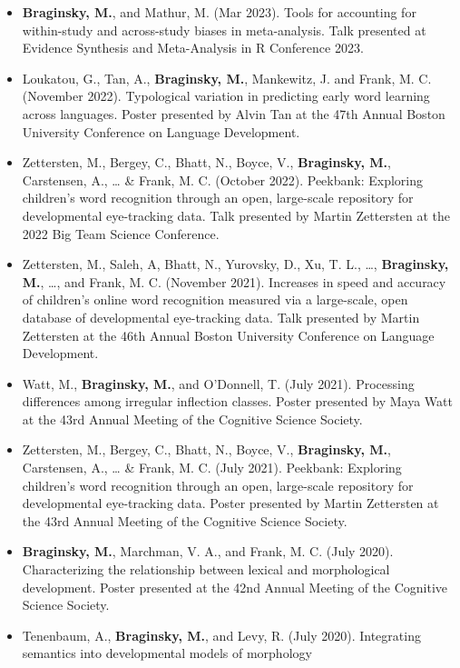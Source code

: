 \documentclass[11pt,]{article}
\begin{document}
\begin{itemize}
\item
  \textbf{Braginsky, M.}, and Mathur, M. (Mar 2023). Tools for
  accounting for within-study and across-study biases in meta-analysis.
  Talk presented at Evidence Synthesis and Meta-Analysis in R Conference
  2023.
\item
  Loukatou, G., Tan, A., \textbf{Braginsky, M.}, Mankewitz, J. and
  Frank, M. C. (November 2022). Typological variation in predicting
  early word learning across languages. Poster presented by Alvin Tan at
  the 47th Annual Boston University Conference on Language Development.
\item
  Zettersten, M., Bergey, C., Bhatt, N., Boyce, V., \textbf{Braginsky,
  M.}, Carstensen, A., \ldots{} \& Frank, M. C. (October 2022).
  Peekbank: Exploring children's word recognition through an open,
  large-scale repository for developmental eye-tracking data. Talk
  presented by Martin Zettersten at the 2022 Big Team Science
  Conference.
\item
  Zettersten, M., Saleh, A, Bhatt, N., Yurovsky, D., Xu, T. L., \ldots,
  \textbf{Braginsky, M.}, \ldots, and Frank, M. C. (November 2021).
  Increases in speed and accuracy of children's online word recognition
  measured via a large-scale, open database of developmental
  eye-tracking data. Talk presented by Martin Zettersten at the 46th
  Annual Boston University Conference on Language Development.
\item
  Watt, M., \textbf{Braginsky, M.}, and O'Donnell, T. (July 2021).
  Processing differences among irregular inflection classes. Poster
  presented by Maya Watt at the 43rd Annual Meeting of the Cognitive
  Science Society.
\item
  Zettersten, M., Bergey, C., Bhatt, N., Boyce, V., \textbf{Braginsky,
  M.}, Carstensen, A., \ldots{} \& Frank, M. C. (July 2021). Peekbank:
  Exploring children's word recognition through an open, large-scale
  repository for developmental eye-tracking data. Poster presented by
  Martin Zettersten at the 43rd Annual Meeting of the Cognitive Science
  Society.
\item
  \textbf{Braginsky, M.}, Marchman, V. A., and Frank, M. C. (July 2020).
  Characterizing the relationship between lexical and morphological
  development. Poster presented at the 42nd Annual Meeting of the
  Cognitive Science Society.
\item
  Tenenbaum, A., \textbf{Braginsky, M.}, and Levy, R. (July 2020).
  Integrating semantics into developmental models of morphology

\end{itemize}
\end{document}

